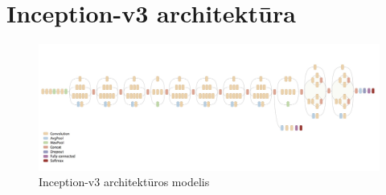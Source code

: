 \documentclass{VUMIFInfKursinis}
\begin{document}
\section{Inception-v3 architektūra}
\begin{figure}[H]
	\centering
	\includegraphics[scale=0.5]{img/inception_v3}
	\caption[]{Inception-v3 architektūros modelis\footnotemark}   %
	\label{img:inception}
\end{figure}
%
%
\end{document}
